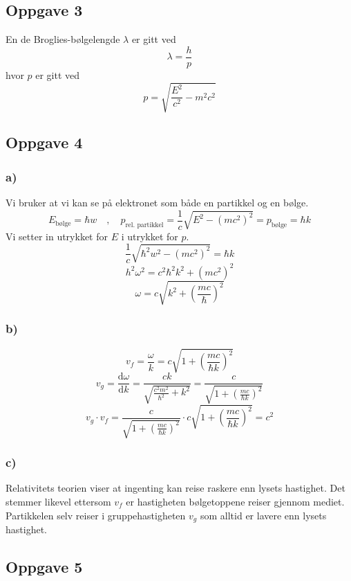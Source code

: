 \documentclass{article}
\begin{document}
\subsection*{Oppgave 3}
En de Broglies-bølgelengde $λ$ er gitt ved 
\[
λ = \frac{h}{p}
\]
hvor $p$ er gitt ved
\[
p = \sqrt{\frac{E^2}{c^2} - m^2c^2}
\]


\subsection*{Oppgave 4}
\subsubsection*{a)}
Vi bruker at vi kan se på elektronet som både en partikkel og en bølge. 
\[
E_{\text{bølge}} = ℏw \quad , \quad p_{\text{rel. partikkel}} = \frac{1}{c} \sqrt{E^2 - \left(mc^2\right)^2} = p_{\text{bølge}} = ℏk
\]
Vi setter in utrykket for $E$ i utrykket for $p$. 
\[
\frac{1}{c} \sqrt{ℏ^2 w^2 - \left(mc^2\right)^2} = ℏk
\]
\[
h^2ω^2 = c^2ℏ^2k^2 + \left(mc^2\right)^2
\]
\[
ω = c\sqrt{k^2 + \left( \frac{mc}{ℏ} \right) ^2}
\]
\subsubsection*{b)}
\[
v_f = \frac{ω}{k} = c \sqrt{1 + \left( \frac{mc}{ℏk} \right) ^2}
\]
\[
v_g = \frac{\mathrm{d}ω}{\mathrm{d}k} = \frac{ck}{\sqrt{\frac{c^2m^2}{ℏ^2} + k^2}} = \frac{c}{\sqrt{1 + \left( \frac{mc}{ℏk} \right)^2}}
\]
\[
v_g ⋅ v_f = \frac{c}{\sqrt{1 + \left( \frac{mc}{ℏk} \right) ^2}} ⋅  c \sqrt{1 + \left( \frac{mc}{ℏk} \right) ^2} = c^2
\]

\subsubsection*{c)}
Relativitets teorien viser at ingenting kan reise raskere enn lysets hastighet. Det stemmer likevel ettersom $v_f$ er hastigheten bølgetoppene reiser gjennom mediet. Partikkelen selv reiser i gruppehastigheten $v_g$ som alltid er lavere enn lysets hastighet. 

\subsection*{Oppgave 5}
\end{document}
